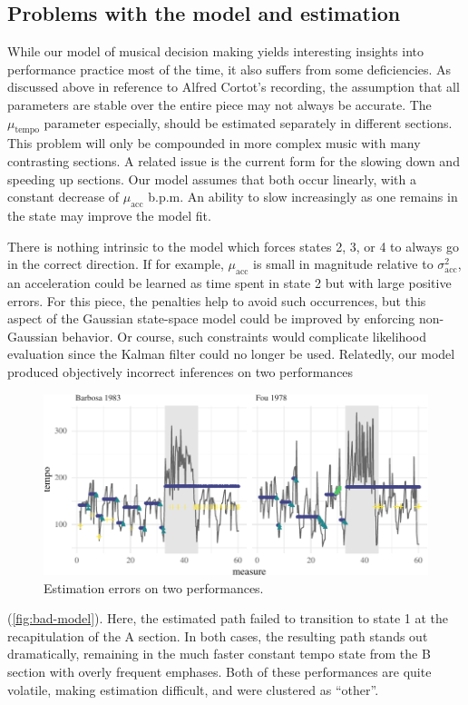 \documentclass[aoas]{imsart}
\begin{document}
\subsection{Problems with the model and estimation}
\label{sec:problems-with-model}

While our model of musical decision making yields interesting insights
into performance practice most of the time, it also suffers from some
deficiencies. As discussed above in reference to Alfred Cortot's
recording, the assumption that all parameters are stable over the
entire piece may not always be accurate. The $\mu_{\textrm{tempo}}$
parameter especially, should be estimated separately in different
sections. This problem will only be compounded in more complex music
with many contrasting sections. A related issue is the current form
for the slowing down and speeding up sections. Our model assumes that
both occur linearly, with a constant decrease of $\mu_{\textrm{acc}}$
b.p.m. An ability to slow increasingly as one remains in the state may
improve the model fit.

There is nothing intrinsic to the model which forces states 2,
3, or 4 to always go in the correct direction. If for example,
$\mu_{\textrm{acc}}$ is small in magnitude relative to
$\sigma^2_{\textrm{acc}}$, an acceleration could be learned as time
spent in state 2 but with large positive errors. For this piece, the
penalties help to avoid such occurrences, but this aspect of the
Gaussian state-space model could be improved by enforcing non-Gaussian
behavior. Or course, such constraints would complicate likelihood
evaluation since the Kalman filter could no longer be used. Relatedly,
our model produced objectively incorrect inferences on two performances
\begin{figure}[t]
  \centering
  \includegraphics[width=.9\linewidth]{bad-model-1}
  \caption{Estimation errors on two performances.}
  \label{fig:bad-model}
\end{figure}
(\autoref{fig:bad-model}). Here, the estimated
path failed to transition to state 1 at the
recapitulation of the A section. In both cases, the resulting path
stands out dramatically, remaining in the much faster constant tempo
state from the B section with overly frequent emphases. Both of these
performances are quite volatile, making estimation difficult, and were clustered as ``other''. 
\end{document}
